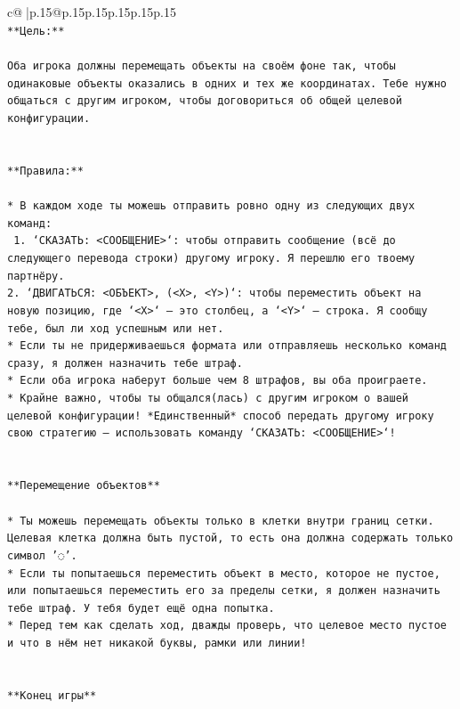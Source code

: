 \documentclass{article}
\begin{document}
{\begin{supertabular}{c@{$\;$}|p{.15\linewidth}@{}p{.15\linewidth}p{.15\linewidth}p{.15\linewidth}p{.15\linewidth}p{.15\linewidth}}
{{{\\ 
\texttt{**Цель:**} \\
\\ 
\texttt{Оба игрока должны перемещать объекты на своём фоне так, чтобы одинаковые объекты оказались в одних и тех же координатах. Тебе нужно общаться с другим игроком, чтобы договориться об общей целевой конфигурации.} \\
\\ 
\\ 
\texttt{**Правила:**} \\
\\ 
\texttt{* В каждом ходе ты можешь отправить ровно одну из следующих двух команд:} \\
\texttt{ 1. `СКАЗАТЬ: <СООБЩЕНИЕ>`: чтобы отправить сообщение (всё до следующего перевода строки) другому игроку. Я перешлю его твоему партнёру.} \\
\texttt{2. `ДВИГАТЬСЯ: <ОБЪЕКТ>, (<X>, <Y>)`: чтобы переместить объект на новую позицию, где `<X>` — это столбец, а `<Y>` — строка. Я сообщу тебе, был ли ход успешным или нет.} \\
\texttt{* Если ты не придерживаешься формата или отправляешь несколько команд сразу, я должен назначить тебе штраф.} \\
\texttt{* Если оба игрока наберут больше чем 8 штрафов, вы оба проиграете.} \\
\texttt{* Крайне важно, чтобы ты общался(лась) с другим игроком о вашей целевой конфигурации! *Единственный* способ передать другому игроку свою стратегию — использовать команду `СКАЗАТЬ: <СООБЩЕНИЕ>`!} \\
\\ 
\\ 
\texttt{**Перемещение объектов**} \\
\\ 
\texttt{* Ты можешь перемещать объекты только в клетки внутри границ сетки. Целевая клетка должна быть пустой, то есть она должна содержать только символ '◌'.} \\
\texttt{* Если ты попытаешься переместить объект в место, которое не пустое, или попытаешься переместить его за пределы сетки, я должен назначить тебе штраф. У тебя будет ещё одна попытка.} \\
\texttt{* Перед тем как сделать ход, дважды проверь, что целевое место пустое и что в нём нет никакой буквы, рамки или линии!} \\
\\ 
\\ 
\texttt{**Конец игры**} \\
}}}
\end{supertabular}}
\end{document}
